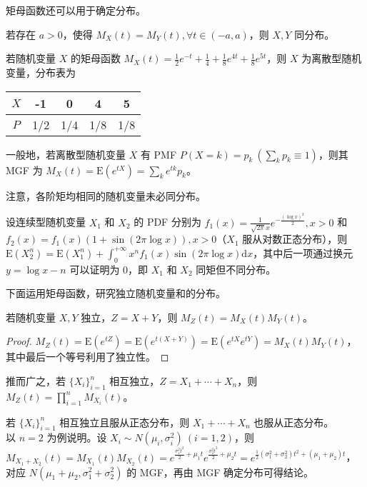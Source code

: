 \documentclass[../main.tex]{subfiles}
\begin{document}
矩母函数还可以用于确定分布。

\begin{theorem}\label{thm:4.6.2}
    若存在 $a>0$，使得 $M_X(t)=M_Y(t),\forall t\in(-a,a)$，则 $X,Y$ 同分布。
\end{theorem}

\begin{example}
    若随机变量 $X$ 的矩母函数 $M_X(t)=\frac12e^{-t}+\frac14+\frac18e^{4t}+\frac18e^{5t}$，则 $X$ 为离散型随机变量，分布表为

    \bigskip
    \begin{tabular}{|c|c|c|c|c|}
        \hline
        $X$ & -1  & 0   & 4   & 5   \\
        \hline
        $P$ & 1/2 & 1/4 & 1/8 & 1/8 \\
        \hline
    \end{tabular}
    \bigskip

    一般地，若离散型随机变量 $X$ 有 PMF $P(X=k)=p_k\ (\sum_k p_k\equiv1)$，则其 MGF 为 $M_X(t)=\mathrm E(e^{tX})=\sum_ke^{tk}p_k$。
\end{example}

注意，各阶矩均相同的随机变量未必同分布。

\begin{example}
    设连续型随机变量 $X_1$ 和 $X_2$ 的 PDF 分别为 $f_1(x)=\frac{1}{\sqrt{2\pi}x}e^{-\frac{(\log x)^2}{2}},x>0$ 和 $f_2(x)=f_1(x)(1+\sin(2\pi\log x)),x>0$（$X_1$ 服从对数正态分布），则 $\mathrm E(X_2^n)=\mathrm E(X_1^n)+\int_0^{+\infty}x^nf_1(x)\sin(2\pi\log x)\mathrm dx$，其中后一项通过换元 $y=\log x-n$ 可以证明为 $0$，即 $X_1$ 和 $X_2$ 同矩但不同分布。
\end{example}

下面运用矩母函数，研究独立随机变量和的分布。

\begin{theorem}\label{thm:4.6.3}
    若随机变量 $X,Y$ 独立，$Z=X+Y$，则 $M_Z(t)=M_X(t)M_Y(t)$。
\end{theorem}

\begin{proof}
    $M_Z(t)=\mathrm E(e^{tZ})=\mathrm E(e^{t(X+Y)})=\mathrm E(e^{tX}e^{tY})=M_X(t)M_Y(t)$，其中最后一个等号利用了独立性。
\end{proof}

推而广之，若 $\{X_i\}_{i=1}^n$ 相互独立，$Z=X_1+\cdots+X_n$，则 $M_Z(t)=\prod_{i=1}^nM_{X_i}(t)$。

\begin{example}
    若 $\{X_i\}_{i=1}^n$ 相互独立且服从正态分布，则 $X_1+\cdots+X_n$ 也服从正态分布。\\
    以 $n=2$ 为例说明。设 $X_i\sim N(\mu_i,\sigma_i^2)\ (i=1,2)$，则 $M_{X_1+X_2}(t)=M_{X_1}(t)M_{X_2}(t)=e^{\frac{\sigma_1^2t^2}2+\mu_1t}e^{\frac{\sigma_2^2t^2}2+\mu_2t}=e^{\frac12(\sigma_1^2+\sigma_2^2)t^2+(\mu_1+\mu_2)t}$，对应 $N(\mu_1+\mu_2,\sigma_1^2+\sigma_2^2)$ 的 MGF，再由 MGF 确定分布可得结论。
\end{example}
\end{document}
